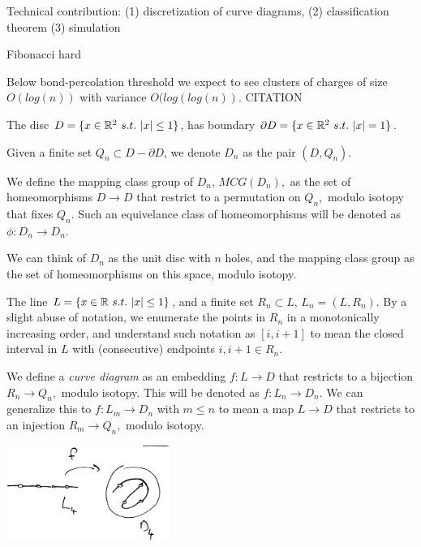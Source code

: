 \documentclass[12pt,a4paper]{article}
\begin{document}
Technical contribution: 
(1) discretization of curve diagrams,
(2) classification theorem
(3) simulation



Fibonacci hard

Below bond-percolation threshold we expect to see clusters
of charges of size $O(log(n))$ with variance $O(log(log(n))$. CITATION



The disc $D = \{ x\in \mathR^2\ s.t.\ |x|\leq 1 \} $,
has boundary $\partial D = \{ x\in \mathbb{R}^2\ s.t.\ |x|=1 \} $.

Given a finite set $ Q_n \subset D-\partial D$,
we denote $D_n$ as the pair $(D, Q_n).$

We define the mapping class group of $D_n$,
$MCG(D_n),$ as the set of homeomorphisms $D\to D$ that
restrict to a permutation on $Q_n,$ modulo isotopy that
fixes $Q_n.$
Such an equivelance class
of homeomorphisms will be denoted as $\phi:D_n\to D_n.$

We can think of $D_n$ as the unit disc with $n$ holes,
and the mapping class group as the set of homeomorphisms on
this space, modulo isotopy.

The line $L = \{ x\in \mathbb{R}\ s.t.\ |x|\leq 1 \} $,
and a finite set $R_n\subset L$,
$L_n = (L, R_n).$
By a slight abuse of notation, we enumerate the points in $R_n$ 
in a monotonically increasing order,
and understand such notation as $[i, i+1]$ to mean the closed interval in $L$
with (consecutive) endpoints $i, i+1 \in R_n.$

We define a {\it curve diagram} as an embedding $f : L\to D$ that
restricts to a bijection $R_n\to Q_n,$ modulo
isotopy.
This will be denoted as $f : L_n\to D_n.$
We can generalize this to $f : L_m\to D_n$ with $m\leq n$
to mean a map $L\to D$ that restricts to an injection $R_m\to Q_n,$
modulo isotopy.

\begin{center}
\includegraphics[width=0.4\textwidth]{curve-diagram.eps}
\end{center}
\end{document}
